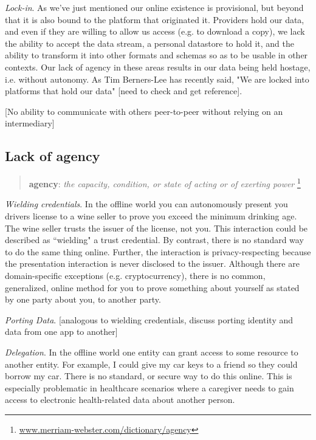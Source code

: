 \documentclass[11pt, oneside]{article}   	%
\newcommand{\hyperfootnote}[1][]{\def\ArgI{{#1}}\hyperfootnoteRelay}
\newcommand\hyperfootnoteRelay[2][]{\href{#1#2}{\ArgI}\footnote{\href{#1#2}{#2}}}
\begin{document}
\emph{Lock-in}. As we've just mentioned our online existence is provisional, but beyond that it is also bound to the platform that originated it. Providers hold our data, and even if they are willing to allow us access (e.g. to download a copy), we lack the ability to accept the data stream, a personal datastore to hold it, and the ability to transform it into other formats and schemas so as to be usable in other contexts. Our lack of agency in these areas results in our data being held hostage, i.e. without autonomy. As Tim Berners-Lee has recently said, "We are locked into platforms that hold our data" [need to check and get reference]. 

[No ability to communicate with others peer-to-peer without relying on an intermediary]

\subsection{Lack of agency}

\begin{quote}
\textbf{a\tiny {}\normalsize gen\tiny {}\normalsize cy}: \emph{the capacity, condition, or state of acting or of exerting power} \hyperfootnote[][https://]{www.merriam-webster.com/dictionary/agency}
\end{quote}

\emph{Wielding credentials}. In the offline world you can autonomously present you drivers license to a wine seller to prove you exceed the minimum drinking age. The wine seller trusts the issuer of the license, not you. This interaction could be described as ``wielding" a trust credential. By contrast, there is no standard way to do the same thing online. Further, the interaction is privacy-respecting because the presentation interaction is never disclosed to the issuer. Although there are domain-specific exceptions (e.g. cryptocurrency), there is no common, generalized, online method for you to prove something about yourself as stated by one party about you, to another party.

\emph{Porting Data}. [analogous to wielding credentials, discuss porting identity and data from one app to another]

\emph{Delegation}. In the offline world one entity can grant access to some resource to another entity. For example, I could give my car keys to a friend so they could borrow my car. There is no standard, or secure way to do this online. This is especially problematic in healthcare scenarios where a caregiver needs to gain access to electronic health-related data about another person.
\end{document}
